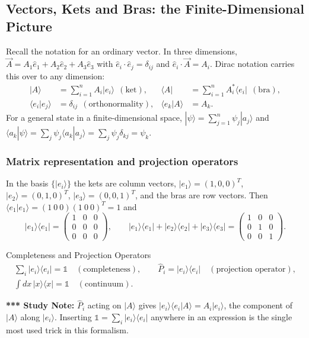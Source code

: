 \documentclass[11pt,a4paper]{article}
\begin{document}
\subsection{Vectors, Kets and Bras: the Finite-Dimensional Picture}
Recall the notation for an ordinary vector. In three dimensions, $\vec A=A_1\hat e_1+A_2\hat e_2+A_3\hat e_3$ with $\hat e_i\cdot\hat e_j=\delta_{ij}$ and $\hat e_i\cdot\vec A=A_i$. Dirac notation carries this over to any dimension:
\begin{align*}
|A\rangle&=\sum_{i=1}^nA_i|e_i\rangle\ \ (\text{ket}), &
\langle A|&=\sum_{i=1}^nA_i^*\langle e_i|\ \ (\text{bra}),\\
\langle e_i|e_j\rangle&=\delta_{ij}\ \ (\text{orthonormality}), &
\langle e_k|A\rangle&=A_k .
\end{align*}
For a general state in a finite-dimensional space, $|\psi\rangle=\sum_{j=1}^n\psi_j|a_j\rangle$ and $\langle a_k|\psi\rangle=\sum_j\psi_j\langle a_k|a_j\rangle=\sum_j\psi_j\delta_{kj}=\psi_k$.

\subsubsection*{Matrix representation and projection operators}
In the basis $\{|e_i\rangle\}$ the kets are column vectors, $|e_1\rangle=(1,0,0)^T$, $|e_2\rangle=(0,1,0)^T$, $|e_3\rangle=(0,0,1)^T$, and the bras are row vectors. Then $\langle e_1|e_1\rangle=(1\ 0\ 0)(1\ 0\ 0)^T=1$ and
\[
|e_1\rangle\langle e_1|=\begin{pmatrix}1&0&0\\0&0&0\\0&0&0\end{pmatrix},\qquad
|e_1\rangle\langle e_1|+|e_2\rangle\langle e_2|+|e_3\rangle\langle e_3|=\begin{pmatrix}1&0&0\\0&1&0\\0&0&1\end{pmatrix}.
\]
\begin{thm}{Completeness and Projection Operators}
\begin{gather*}
\sum_i|e_i\rangle\langle e_i|=\mathbb 1\quad(\text{completeness}),\qquad
\hat P_i=|e_i\rangle\langle e_i|\quad(\text{projection operator}),\\
\int dx\,|x\rangle\langle x|=\mathbb 1\quad(\text{continuum}).
\end{gather*}
\end{thm}

\textbf{*** Study Note:} $\hat P_i$ acting on $|A\rangle$ gives $|e_i\rangle\langle e_i|A\rangle=A_i|e_i\rangle$, the component of $|A\rangle$ along $|e_i\rangle$. Inserting $\mathbb 1=\sum_i|e_i\rangle\langle e_i|$ anywhere in an expression is the single most used trick in this formalism.
\end{document}
